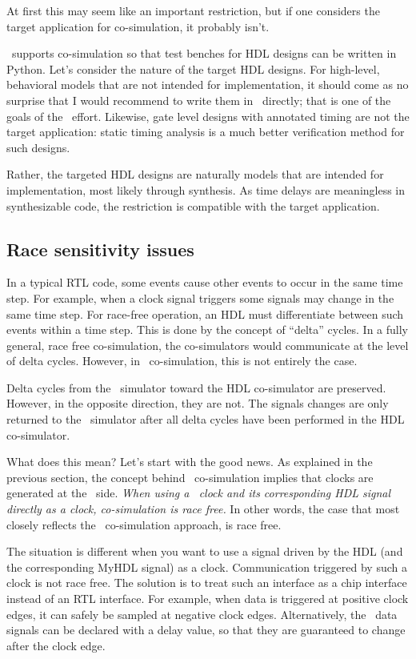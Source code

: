 At first this may seem like an important restriction, but if one
considers the target application for co-simulation, it probably
isn't. 

\myhdl\ supports co-simulation so that test benches for HDL
designs can be written in Python.  Let's consider the nature of the
target HDL designs. For high-level, behavioral models that are not
intended for implementation, it should come as no surprise that I
would recommend to write them in \myhdl\ directly; that is one of the
goals of the \myhdl\ effort. Likewise, gate level designs with
annotated timing are not the target application: static timing
analysis is a much better verification method for such designs.

Rather, the targeted HDL designs are naturally models that are
intended for implementation, most likely through synthesis. As time
delays are meaningless in synthesizable code, the restriction is
compatible with the target application.

\subsection{Race sensitivity issues \label{cosim-race}}

In a typical RTL code, some events cause other events to occur in the
same time step. For example, when a clock signal triggers some signals
may change in the same time step. For race-free operation, an HDL
must differentiate between such events within a time step. This is done
by the concept of ``delta'' cycles. In a fully general, race free
co-simulation, the co-simulators would communicate at the level of delta
cycles. However, in \myhdl\ co-simulation, this is not entirely the
case.

Delta cycles from the \myhdl\ simulator toward the HDL co-simulator are
preserved. However, in the opposite direction, they are not. The
signals changes are only returned to the \myhdl\ simulator after all delta
cycles have been performed in the HDL co-simulator.

What does this mean? Let's start with the good news. As explained in
the previous section, the concept behind \myhdl\ co-simulation implies
that clocks are generated at the \myhdl\ side.  \emph{When using a
\myhdl\ clock and its corresponding HDL signal directly as a clock,
co-simulation is race free.} In other words, the case
that most closely reflects the \myhdl\ co-simulation approach, is race free.

The situation is different when you want to use a signal driven by the
HDL (and the corresponding MyHDL signal) as a clock. 
Communication triggered by such a clock is not race free. The solution
is to treat such an interface as a chip interface instead of an RTL
interface.  For example, when data is triggered at positive clock
edges, it can safely be sampled at negative clock edges.
Alternatively, the \myhdl\ data signals can be declared with a delay
value, so that they are guaranteed to change after the clock
edge.


